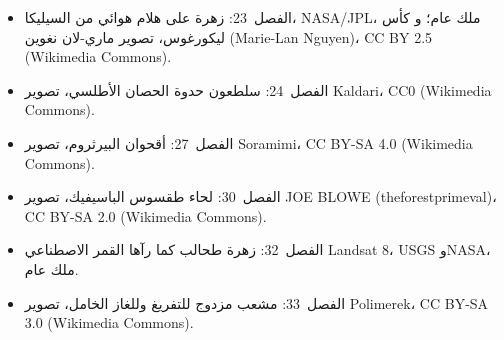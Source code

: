 \begin{itemize}
        عام (Wikimedia Commons).
  \item الفصل~23: زهرة على هلام هوائي من السيليكا، NASA/JPL، ملك عام؛ و
        كأس ليكورغوس، تصوير ماري-لان نغوين (Marie-Lan Nguyen)، CC BY 2.5 (Wikimedia Commons).
  \item الفصل~24: سلطعون حدوة الحصان الأطلسي، تصوير Kaldari، CC0 (Wikimedia
        Commons).
  \item الفصل~27: أقحوان البيرثروم، تصوير Soramimi، CC BY-SA 4.0 (Wikimedia
        Commons).
  \item الفصل~30: لحاء طقسوس الباسيفيك، تصوير JOE BLOWE (theforestprimeval)،
        CC BY-SA 2.0 (Wikimedia Commons).
  \item الفصل~32: زهرة طحالب كما رآها القمر الاصطناعي Landsat 8، USGS وNASA،
        ملك عام.
  \item الفصل~33: مشعب مزدوج للتفريغ وللغاز الخامل، تصوير Polimerek، CC BY-SA
        3.0 (Wikimedia Commons).
\end{itemize}
\clearpage
